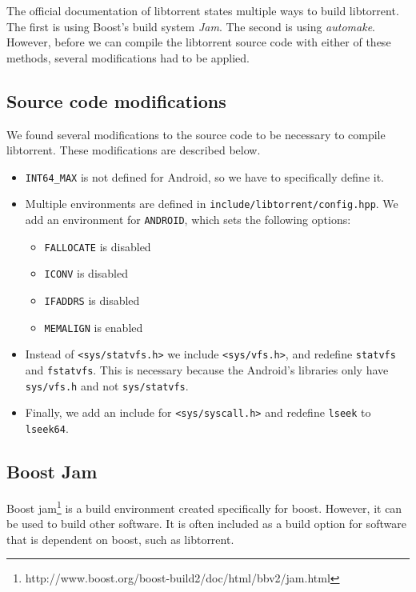 		The official documentation of libtorrent states multiple ways to build libtorrent. The first is using Boost's build system \emph{Jam}. The second is using \emph{automake}. However, before we can compile the libtorrent source code with either of these methods, several modifications had to be applied.
		
		\subsection{Source code modifications}
				
		We found several modifications to the source code to be necessary to compile libtorrent. These modifications are described below.
		
		\begin{itemize}
		\item \texttt{INT64\_MAX} is not defined for Android, so we have to specifically define it.
		\item Multiple environments are defined in \texttt{include/libtorrent/config.hpp}. We add an environment for \texttt{ANDROID}, which sets the following options:
			\begin{itemize}
				\item \texttt{FALLOCATE} is disabled
				\item \texttt{ICONV} is disabled
				\item \texttt{IFADDRS} is disabled
				\item \texttt{MEMALIGN} is enabled
			\end{itemize}
		\item Instead of \texttt{<sys/statvfs.h>} we include \texttt{<sys/vfs.h>}, and redefine \texttt{statvfs} and \texttt{fstatvfs}. This is necessary because the Android's libraries only have \texttt{sys/vfs.h} and not \texttt{sys/statvfs}.
		\item Finally, we add an include for \texttt{<sys/syscall.h>} and redefine \texttt{lseek} to \texttt{lseek64}.
		\end{itemize}
		
		\subsection{Boost Jam}
		Boost jam\footnote{http://www.boost.org/boost-build2/doc/html/bbv2/jam.html} is a build environment created specifically for boost. However, it can be used to build other software. It is often included as a build option for software that is dependent on boost, such as libtorrent.
		
